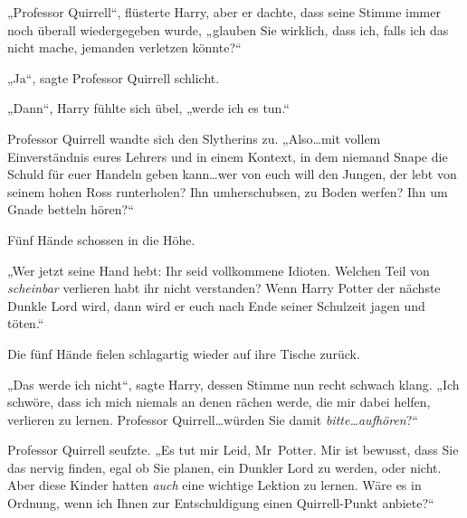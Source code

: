„Professor Quirrell“, flüsterte Harry, aber er dachte, dass seine Stimme immer noch überall wiedergegeben wurde, „glauben Sie wirklich, dass ich, falls ich das nicht mache, jemanden verletzen könnte?“

„Ja“, sagte Professor Quirrell schlicht.

„Dann“, Harry fühlte sich übel, „werde ich es tun.“

Professor Quirrell wandte sich den Slytherins zu. „Also…mit vollem Einverständnis eures Lehrers und in einem Kontext, in dem niemand Snape die Schuld für euer Handeln geben kann…wer von euch will den Jungen, der lebt von seinem hohen Ross runterholen? Ihn umherschubsen, zu Boden werfen? Ihn um Gnade betteln hören?“

Fünf Hände schossen in die Höhe.

„Wer jetzt seine Hand hebt: Ihr seid vollkommene Idioten. Welchen Teil von \emph{scheinbar} verlieren habt ihr nicht verstanden? Wenn Harry Potter der nächste Dunkle Lord wird, dann wird er euch nach Ende seiner Schulzeit jagen und töten.“

Die fünf Hände fielen schlagartig wieder auf ihre Tische zurück.

„Das werde ich nicht“, sagte Harry, dessen Stimme nun recht schwach klang. „Ich schwöre, dass ich mich niemals an denen rächen werde, die mir dabei helfen, verlieren zu lernen. Professor Quirrell…würden Sie damit \emph{bitte…aufhören}?“

Professor Quirrell seufzte. „Es tut mir Leid, Mr~Potter. Mir ist bewusst, dass Sie das nervig finden, egal ob Sie planen, ein Dunkler Lord zu werden, oder nicht. Aber diese Kinder hatten \emph{auch} eine wichtige Lektion zu lernen. Wäre es in Ordnung, wenn ich Ihnen zur Entschuldigung einen Quirrell-Punkt anbiete?“

